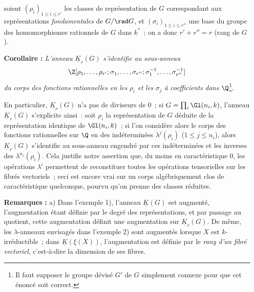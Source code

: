 soient $(\rho_i)_{1\leq i\leq r'}$ les classes de représentation de $G$ correspondant aux représentations \emph{fondamentales} de $G/\rad G$, et $(\sigma_i)_{1\leq i\leq r''}$ une base du groupe des homomorphismes rationnels de $G$ dans $k^*$~; on a donc $r'+r''=r$ (rang de $G$).

\textbf{Corollaire :} \emph{L'anneau $\underline{K}_r(G)$ s'identifie au sous-anneau}
\[
\Z[\rho_1,\ldots,\rho_{r'};\sigma_1,\ldots,\sigma_{r''};\sigma_1^{-1},\ldots,\sigma_{r''}^{-1}]
\]
\emph{du corps des fonctions rationnelles en les $\rho_i$ et les $\sigma_j$ à coefficients dans $\Q$}\footnote{Il faut supposer le groupe dévisé $G'$ de $G$ simplement connexe pour que cet énoncé soit correct.}.

En particulier, $\underline{K}_r(G)$ n'a pas de diviseurs de $0$~; si $G=\prod_i\Gl(n_i,k)$, l'anneau $\underline{K}_r(G)$ s'explicite ainsi~: soit $\rho_i$ la représentation de $G$ déduite de la représentation identique de $\Gl(n_i,k)$~; si l'on considère alors le corps des fonctions rationnelles sur $\Q$ en des indéterminées $\lambda^j(\rho_i)$ ($1\leq j\leq n_i$), alors $\underline{K}_r(G)$ s'identifie au sous-anneau engendré par ces indéterminées et les inverses des $\lambda^{n_i}(\rho_i)$. Cela justifie notre assertion que, du moins en caractéristique $0$, les opérations $\lambda^i$ permettent de reconstituer toutes les opérations tensorielles sur les fibrés vectoriels~; ceci est encore vrai sur un corps algébriquement clos de caractéristique quelconque, pourvu qu'on prenne des classes réduites.

\textbf{Remarques :} a) Dans l'exemple 1), l'anneau $\underline{K}(G)$ est augmenté, l'augmentation étant définie par le degré des représentations, et par passage au quotient, cette augmentation définit une augmentation sur $\underline{K}_r(G)$. De même, les $\lambda$-anneaux envisagés dans l'exemple 2) sont augmentés lorsque $X$ est $k$-irréductible~; dans $\underline{K}(\xi(X))$, l'augmentation est définie par le \emph{rang d'un fibré vectoriel}, c'est-à-dire la dimension de ses fibres.

